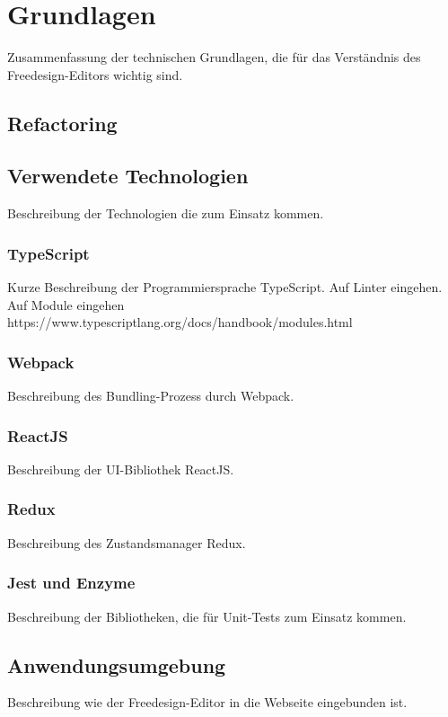 \chapter{Grundlagen}
Zusammenfassung der technischen Grundlagen, die für das Verständnis des Freedesign-Editors wichtig sind.



\section{Refactoring}

\section{Verwendete Technologien}
Beschreibung der Technologien die zum Einsatz kommen.

\subsection{TypeScript}
Kurze Beschreibung der Programmiersprache TypeScript.
Auf Linter eingehen.
Auf Module eingehen https://www.typescriptlang.org/docs/handbook/modules.html

\subsection{Webpack}
Beschreibung des Bundling-Prozess durch Webpack.

\subsection{ReactJS}
Beschreibung der UI-Bibliothek ReactJS.

\subsection{Redux}
Beschreibung des Zustandsmanager Redux.

\subsection{Jest und Enzyme}
Beschreibung der Bibliotheken, die für Unit-Tests zum Einsatz kommen.

\section{Anwendungsumgebung}
Beschreibung wie der Freedesign-Editor in die Webseite eingebunden ist.

